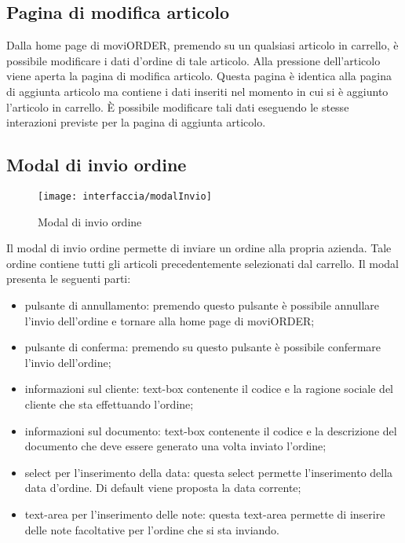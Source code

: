 \subsection{Pagina di modifica articolo}

Dalla home page di moviORDER, premendo su un qualsiasi articolo in carrello, è possibile modificare i dati d'ordine di tale articolo. Alla pressione dell'articolo viene aperta la pagina di modifica articolo. Questa pagina è identica alla pagina di aggiunta articolo ma contiene i dati inseriti nel momento in cui si è aggiunto l'articolo in carrello. È possibile modificare tali dati eseguendo le stesse interazioni previste per la pagina di aggiunta articolo.

\subsection{Modal di invio ordine}

\begin{figure}[!h] 
    \centering 
    \texttt{[image: interfaccia/modalInvio]} 
    \caption{Modal di invio ordine}
\end{figure}

Il modal di invio ordine permette di inviare un ordine alla propria azienda. Tale ordine contiene tutti gli articoli precedentemente selezionati dal carrello. Il modal presenta le seguenti parti:
\begin{itemize}
	\item pulsante di annullamento: premendo questo pulsante è possibile annullare l'invio dell'ordine e tornare alla home page di moviORDER;
	\item pulsante di conferma: premendo su questo pulsante è possibile confermare l'invio dell'ordine;
	\item informazioni sul cliente: text-box contenente il codice e la ragione sociale del cliente che sta effettuando l'ordine;
	\item informazioni sul documento: text-box contenente il codice e la descrizione del documento che deve essere generato una volta inviato l'ordine;
	\item select per l'inserimento della data: questa select permette l'inserimento della data d'ordine. Di default viene proposta la data corrente;
	\item text-area per l'inserimento delle note: questa text-area permette di inserire delle note facoltative per l'ordine che si sta inviando.
\end{itemize}

